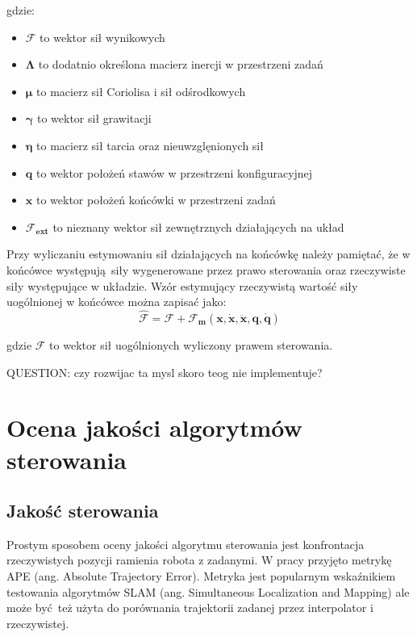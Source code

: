 gdzie:
\begin{itemize}
	\item $\boldsymbol{\mathcal{F}}$ to wektor sił wynikowych
	\item $\boldsymbol{\Lambda}$ to dodatnio określona macierz inercji w przestrzeni zadań
	\item $\boldsymbol{\mu}$ to macierz sił Coriolisa i sił odśrodkowych	
	\item $\boldsymbol{\gamma}$ to wektor sił grawitacji
	\item $\boldsymbol{\eta}$ to macierz sił tarcia oraz nieuwzglęnionych sił
	\item $\boldsymbol{q}$ to wektor położeń stawów w przestrzeni konfiguracyjnej
	\item $\boldsymbol{x}$ to wektor położeń końcówki w przestrzeni zadań
	\item $ \boldsymbol{\mathcal{F}_{ext}}$ to nieznany wektor sił zewnętrznych działających na układ
\end{itemize} 

Przy wyliczaniu estymowaniu sił działających na końcówkę należy pamiętać, że w końcówce występują siły wygenerowane przez prawo sterowania oraz rzeczywiste siły występujące w układzie. Wzór estymujący rzeczywistą wartość siły uogólnionej w końcówce można zapisać jako:
\begin{equation}
\boldsymbol{\mathcal{\hat{F}}} = \boldsymbol{\mathcal{F}} + \boldsymbol{\mathcal{F}_m}(\boldsymbol{x}, \dot{\boldsymbol{x}}, \ddot{\boldsymbol{x}}, \boldsymbol{q}, \dot{\boldsymbol{q}})
\end{equation}

gdzie $\boldsymbol{\mathcal{F}}$ to wektor sił uogólnionych wyliczony prawem sterowania.

QUESTION: czy rozwijac ta mysl skoro teog nie implementuje?

\section{Ocena jakości algorytmów sterowania}
\subsection{Jakość sterowania}
Prostym sposobem oceny jakości algorytmu sterowania jest konfrontacja rzeczywistych pozycji ramienia robota z zadanymi. W pracy przyjęto metrykę APE (ang. Absolute Trajectory Error). Metryka jest popularnym wskaźnikiem testowania algorytmów SLAM (ang. Simultaneous Localization and Mapping) ale może być też użyta do porównania trajektorii zadanej przez interpolator i rzeczywistej. 

